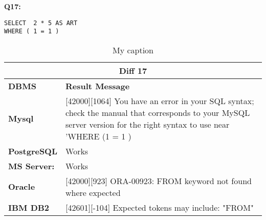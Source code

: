 \begin{mdframed}[backgroundcolor=gray!20] 
\textbf{Q17:}
\begin{lstlisting}
SELECT  2 * 5 AS ART
WHERE ( 1 = 1 )
\end{lstlisting}
\end{mdframed} 

\begin{table}[h]
\centering
\caption{My caption}
\label{my-label}
\begin{tabular}{|p{2cm}|p{12cm}|}
\hline
\multicolumn{2}{|c|}{\textbf{Diff 17}}                                                                                                                                                                                                          \\ \hline
\textbf{DBMS}                              & \textbf{Result Message}                                                                                                                                                                            \\ \hline
{\color[HTML]{333333} \textbf{Mysql}}      & {\color[HTML]{333333} {[}42000{]}{[}1064{]} You have an error in your SQL syntax; check the manual that corresponds to your MySQL server version for the right syntax to use near 'WHERE (1 = 1 )} \\ \hline
{\color[HTML]{333333} \textbf{PostgreSQL}} & {\color[HTML]{333333} Works}                                                                                                                                                                       \\ \hline
{\color[HTML]{333333} \textbf{MS Server:}} & {\color[HTML]{333333} Works}                                                                                                                                                                       \\ \hline
\textbf{Oracle}                            & {[}42000{]}{[}923{]} ORA-00923: FROM keyword not found where expected                                                                                                                              \\ \hline
\textbf{IBM DB2}                           & {[}42601{]}{[}-104{]} Expected tokens may include: "FROM"                                                                                                                                          \\ \hline
\end{tabular}
\end{table}

